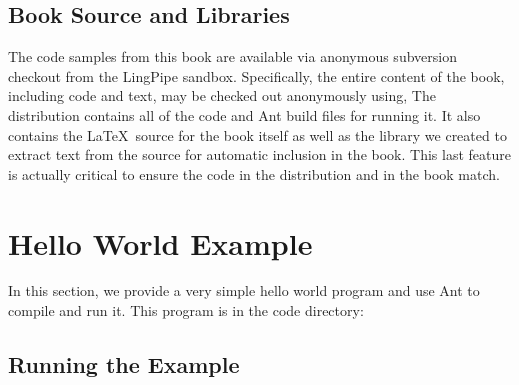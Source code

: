 \subsection{Book Source and Libraries}

The code samples from this book are available via anonymous subversion checkout
from the LingPipe sandbox.  Specifically, the entire content of the book,
including code and text, may be checked out anonymously using,
%
%
The distribution contains all of the code and Ant build files for
running it.  It also contains the \LaTeX\ source for the book itself
as well as the library we created to extract text from the source for
automatic inclusion in the book.  This last feature is actually
critical to ensure the code in the distribution and in the book match.  


\section{Hello World Example}

In this section, we provide a very simple hello world program
and use Ant to compile and run it.
This program is in the code directory:
%

\subsection{Running the Example}

